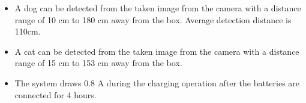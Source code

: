 \begin{itemize}
\item A dog can be detected from the taken image from the camera with a distance range of 10 cm to 180 cm away from the box. Average detection distance is 110cm. 
\item A cat can be detected from the taken image from the camera with a distance range of 15 cm to 153 cm away from the box.
\item The system draws 0.8 A during the charging operation after the batteries are connected for 4 hours.





\end{itemize}

